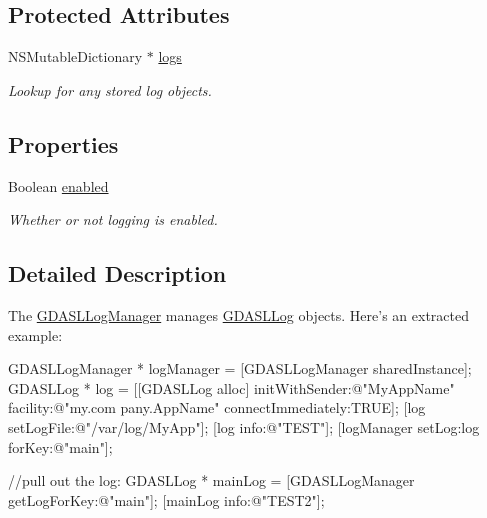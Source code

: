 \subsection*{Protected Attributes}
\begin{DoxyCompactItemize}
\item 
\hypertarget{interface_g_d_a_s_l_log_manager_a6505dba9527376aa268841aac15478e8}{
NSMutableDictionary $\ast$ \hyperlink{interface_g_d_a_s_l_log_manager_a6505dba9527376aa268841aac15478e8}{logs}}
\label{interface_g_d_a_s_l_log_manager_a6505dba9527376aa268841aac15478e8}

\begin{DoxyCompactList}\small\item\em Lookup for any stored log objects. \item\end{DoxyCompactList}\end{DoxyCompactItemize}
\subsection*{Properties}
\begin{DoxyCompactItemize}
\item 
Boolean \hyperlink{interface_g_d_a_s_l_log_manager_ad294e2a3caeb036f104d65b4c477820a}{enabled}
\begin{DoxyCompactList}\small\item\em Whether or not logging is enabled. \item\end{DoxyCompactList}\end{DoxyCompactItemize}


\subsection{Detailed Description}
The \hyperlink{interface_g_d_a_s_l_log_manager}{GDASLLogManager} manages \hyperlink{interface_g_d_a_s_l_log}{GDASLLog} objects. Here's an extracted example: 
\begin{DoxyCode}
 GDASLLogManager * logManager = [GDASLLogManager sharedInstance];
 GDASLLog * log = [[GDASLLog alloc] initWithSender:@"MyAppName" facility:@"my.com
      pany.AppName" connectImmediately:TRUE];
 [log setLogFile:@"/var/log/MyApp"];
 [log info:@"TEST"];
 [logManager setLog:log forKey:@"main"];

 //pull out the log:
 GDASLLog * mainLog = [GDASLLogManager getLogForKey:@"main"];
 [mainLog info:@"TEST2"];
\end{DoxyCode}
 

